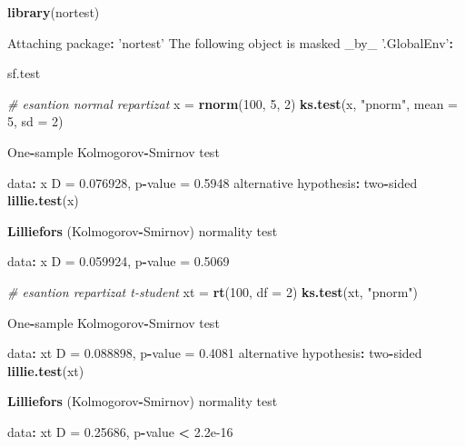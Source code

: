 \documentclass[]{article}
\newenvironment{Shaded}{\begin{snugshade}}{\end{snugshade}}
\newcommand{\KeywordTok}[1]{\textcolor[rgb]{0.13,0.29,0.53}{\textbf{#1}}}
\newcommand{\DataTypeTok}[1]{\textcolor[rgb]{0.13,0.29,0.53}{#1}}
\newcommand{\DecValTok}[1]{\textcolor[rgb]{0.00,0.00,0.81}{#1}}
\newcommand{\FloatTok}[1]{\textcolor[rgb]{0.00,0.00,0.81}{#1}}
\newcommand{\StringTok}[1]{\textcolor[rgb]{0.31,0.60,0.02}{#1}}
\newcommand{\CommentTok}[1]{\textcolor[rgb]{0.56,0.35,0.01}{\textit{#1}}}
\newcommand{\OperatorTok}[1]{\textcolor[rgb]{0.81,0.36,0.00}{\textbf{#1}}}
\newcommand{\NormalTok}[1]{#1}
\begin{document}
\begin{Shaded}
\begin{Highlighting}[]
\KeywordTok{library}\NormalTok{(nortest)}

\NormalTok{Attaching package}\OperatorTok{:}\StringTok{ 'nortest'}
\NormalTok{The following object is masked _by_ }\StringTok{'.GlobalEnv'}\OperatorTok{:}

\StringTok{    }\NormalTok{sf.test}

\CommentTok{# esantion normal repartizat }
\NormalTok{x =}\StringTok{ }\KeywordTok{rnorm}\NormalTok{(}\DecValTok{100}\NormalTok{, }\DecValTok{5}\NormalTok{, }\DecValTok{2}\NormalTok{)}
\KeywordTok{ks.test}\NormalTok{(x, }\StringTok{"pnorm"}\NormalTok{, }\DataTypeTok{mean =} \DecValTok{5}\NormalTok{, }\DataTypeTok{sd =} \DecValTok{2}\NormalTok{)}

\NormalTok{    One}\OperatorTok{-}\NormalTok{sample Kolmogorov}\OperatorTok{-}\NormalTok{Smirnov test}

\NormalTok{data}\OperatorTok{:}\StringTok{  }\NormalTok{x}
\NormalTok{D =}\StringTok{ }\FloatTok{0.076928}\NormalTok{, p}\OperatorTok{-}\NormalTok{value =}\StringTok{ }\FloatTok{0.5948}
\NormalTok{alternative hypothesis}\OperatorTok{:}\StringTok{ }\NormalTok{two}\OperatorTok{-}\NormalTok{sided}
\KeywordTok{lillie.test}\NormalTok{(x)}

    \KeywordTok{Lilliefors}\NormalTok{ (Kolmogorov}\OperatorTok{-}\NormalTok{Smirnov) normality test}

\NormalTok{data}\OperatorTok{:}\StringTok{  }\NormalTok{x}
\NormalTok{D =}\StringTok{ }\FloatTok{0.059924}\NormalTok{, p}\OperatorTok{-}\NormalTok{value =}\StringTok{ }\FloatTok{0.5069}

\CommentTok{# esantion repartizat t-student}
\NormalTok{xt =}\StringTok{ }\KeywordTok{rt}\NormalTok{(}\DecValTok{100}\NormalTok{, }\DataTypeTok{df =} \DecValTok{2}\NormalTok{)}
\KeywordTok{ks.test}\NormalTok{(xt, }\StringTok{"pnorm"}\NormalTok{)}

\NormalTok{    One}\OperatorTok{-}\NormalTok{sample Kolmogorov}\OperatorTok{-}\NormalTok{Smirnov test}

\NormalTok{data}\OperatorTok{:}\StringTok{  }\NormalTok{xt}
\NormalTok{D =}\StringTok{ }\FloatTok{0.088898}\NormalTok{, p}\OperatorTok{-}\NormalTok{value =}\StringTok{ }\FloatTok{0.4081}
\NormalTok{alternative hypothesis}\OperatorTok{:}\StringTok{ }\NormalTok{two}\OperatorTok{-}\NormalTok{sided}
\KeywordTok{lillie.test}\NormalTok{(xt)}

    \KeywordTok{Lilliefors}\NormalTok{ (Kolmogorov}\OperatorTok{-}\NormalTok{Smirnov) normality test}

\NormalTok{data}\OperatorTok{:}\StringTok{  }\NormalTok{xt}
\NormalTok{D =}\StringTok{ }\FloatTok{0.25686}\NormalTok{, p}\OperatorTok{-}\NormalTok{value }\OperatorTok{<}\StringTok{ }\FloatTok{2.2e-16}
\end{Highlighting}
\end{Shaded}
\end{document}
